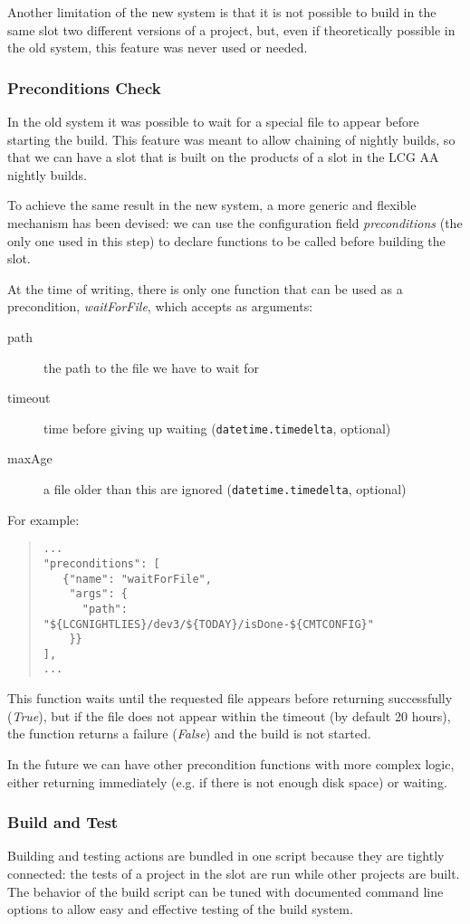 Another limitation of the new system is that it is not possible to build in the
same slot two different versions of a project, but, even if theoretically
possible in the old system, this feature was never used or needed.

\subsubsection{Preconditions Check}
\label{sec:CoreTools:Preconditions}
In the old system it was possible to wait for a special file to appear before
starting the build.  This feature was meant to allow chaining of nightly builds,
so that we can have a slot that is built on the products of a slot in the LCG AA
nightly builds.

To achieve the same result in the new system, a more generic and flexible
mechanism has been devised: we can use the configuration field
\emph{preconditions} (the only one used in this step) to declare functions to be
called before building the slot.

At the time of writing, there is only one function that can be used as a
precondition, \emph{waitForFile}, which accepts as arguments:
\begin{description}
  \item[path] the path to the file we have to wait for
  \item[timeout] time before giving up waiting (\texttt{datetime.timedelta},
  optional)
  \item[maxAge] a file older than this are ignored (\texttt{datetime.timedelta},
  optional)
\end{description}
For example:
\begin{quote}
\begin{verbatim}
...
"preconditions": [
   {"name": "waitForFile",
    "args": {
      "path": "${LCGNIGHTLIES}/dev3/${TODAY}/isDone-${CMTCONFIG}"
    }}
],
...
\end{verbatim}
\end{quote}
This function waits until the requested file appears before returning
successfully (\emph{True}), but if the file does not appear within the timeout
(by default 20 hours), the function returns a failure (\emph{False}) and the
build is not started.

In the future we can have other precondition functions with more complex logic,
either returning immediately (e.g. if there is not enough disk space) or
waiting.

\subsubsection{Build and Test}
\label{sec:CoreTools:Build}
Building and testing actions are bundled in one script because they are tightly
connected: the tests of a project in the slot are run while other projects are
built.  The behavior of the build script can be tuned with documented command
line options to allow easy and effective testing of the build system.

